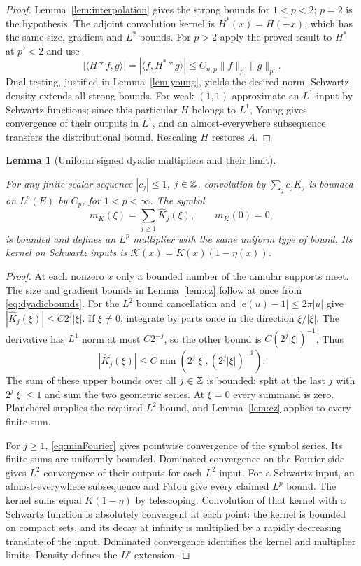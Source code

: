 \documentclass[11pt,oneside]{article}
\newtheorem{lemma}[theorem]{Lemma}
\theoremstyle{definition}\newtheorem{definition}[theorem]{Definition}
\theoremstyle{remark}\newtheorem{remark}[theorem]{Remark}
\newcommand{\ee}[1]{\mathrm e\!\left(#1\right)}
\newcommand{\bp}[1]{\leavevmode\par\nobreak\noindent{\normalfont\small\sffamily Blueprint identifier: \texttt{#1}.}\par\nobreak}
\begin{document}
\begin{proof}
Lemma~\ref{lem:interpolation} gives the strong bounds for $1<p<2$; $p=2$
is the hypothesis. The adjoint convolution kernel is
$H^*(x)=\overline{H(-x)}$, which has the same size, gradient and $L^2$ bounds.
For $p>2$ apply the proved result to $H^*$ at $p'<2$ and use
\[
 |\langle H*f,g\rangle|=|\langle f,H^**g\rangle|
 \leq C_{n,p}\|f\|_p\|g\|_{p'}.
\]
Dual testing, justified in Lemma~\ref{lem:young}, yields the desired norm.
Schwartz density extends all strong bounds. For weak $(1,1)$ approximate
an $L^1$ input by Schwartz functions; since this particular $H$ belongs to
$L^1$, Young gives convergence of their outputs in $L^1$, and an
almost-everywhere subsequence transfers the distributional bound. Rescaling
$H$ restores $A$.
\end{proof}

\begin{lemma}[Uniform signed dyadic multipliers and their limit]\label{lem:signedK}
\bp{signed\_dyadic\_cz}
For any finite scalar sequence $|c_j|\leq1$, $j\in\mathbb Z$, convolution by
$\sum_jc_jK_j$ is bounded on $L^p(E)$ by $C_p$, for $1<p<\infty$.
The symbol
\[
 m_K(\xi)=\sum_{j\geq1}\widehat K_j(\xi),\qquad m_K(0)=0,
\]
is bounded and defines an $L^p$ multiplier with the same uniform type of
bound. Its kernel on Schwartz inputs is
$\mathcal K(x)=K(x)(1-\eta(x))$.
\end{lemma}
\begin{proof}
At each nonzero $x$ only a bounded number of the annular supports meet.
The size and gradient bounds in Lemma~\ref{lem:cz} follow at once from
\eqref{eq:dyadicbounds}. For the $L^2$ bound cancellation and
$|\ee{u}-1|\leq2\pi|u|$ give
$|\widehat K_j(\xi)|\leq C2^j|\xi|$. If $\xi\ne0$, integrate by parts once
in the direction $\xi/|\xi|$. The derivative has $L^1$ norm at most $C2^{-j}$,
so the other bound is $C(2^j|\xi|)^{-1}$. Thus
\begin{equation}\label{eq:minFourier}
 |\widehat K_j(\xi)|\leq C\min(2^j|\xi|,(2^j|\xi|)^{-1}).
\end{equation}
The sum of these upper bounds over all $j\in\mathbb Z$ is bounded: split at the
last $j$ with $2^j|\xi|\leq1$ and sum the two geometric series. At $\xi=0$
every summand is zero. Plancherel supplies the required $L^2$ bound, and
Lemma~\ref{lem:cz} applies to every finite sum.

For $j\geq1$, \eqref{eq:minFourier} gives pointwise convergence of the symbol
series. Its finite sums are uniformly bounded. Dominated convergence on the
Fourier side gives $L^2$ convergence of their outputs for each $L^2$ input.
For a Schwartz input, an almost-everywhere subsequence and Fatou give every
claimed $L^p$ bound. The kernel sums equal $K(1-\eta)$ by telescoping.
Convolution of that kernel with a Schwartz function is absolutely convergent
at each point: the kernel is bounded on compact sets, and its decay at
infinity is multiplied by a rapidly decreasing translate of the input.
Dominated convergence identifies the kernel and multiplier limits.
Density defines the $L^p$ extension.
\end{proof}
\end{document}
